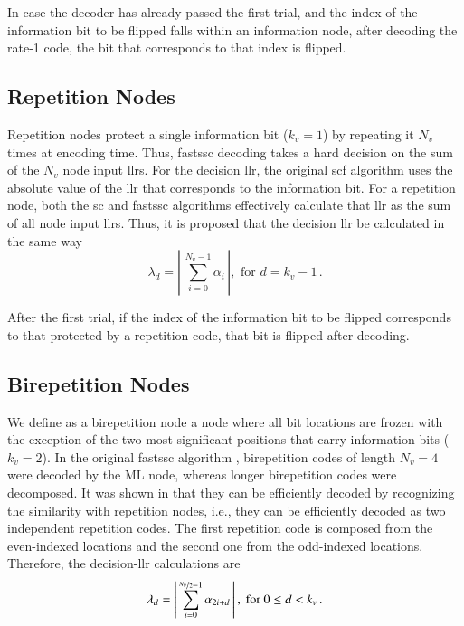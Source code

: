 \documentclass[conference]{IEEEtran}
\begin{document}
In case the decoder has already passed the first trial, and the index of the information bit to be flipped falls within an information node, after decoding the rate-1 code, the bit that corresponds to that index is flipped.

\subsection{Repetition Nodes}
Repetition nodes protect a single information bit ($k_v=1$) by repeating it $N_v$ times at encoding time. Thus, \gls{fastssc} decoding takes a hard decision on the sum of the $N_v$ node input \glspl{llr}. For the decision \gls{llr}, the original \gls{scf} algorithm uses the absolute value of the \gls{llr} that corresponds to the information bit. For a repetition node, both the \gls{sc} and \gls{fastssc} algorithms effectively calculate that \gls{llr} as the sum of all node input \glspl{llr}. Thus, it is proposed that the decision \gls{llr} be calculated in the same way
\begin{equation}
  \label{eq:rep:lambda}
  \lambda_d=\left|\,\sum_{i=0}^{N_v-1}\alpha_i\,\right|,\text{ for }d=k_v-1\,.
\end{equation}

After the first trial, if the index of the information bit to be flipped corresponds to that protected by a repetition code, that bit is flipped after decoding.

\subsection{Birepetition Nodes}
We define as a birepetition node a node where all bit locations are frozen with the exception of the two most-significant positions that carry information bits ($k_v=2$). In the original \gls{fastssc} algorithm \cite{Sarkis_JSAC_2014}, birepetition codes of length $N_v=4$ were decoded by the ML node, whereas longer birepetition codes were decomposed. It was shown in \cite{Hanif2017} that they can be efficiently decoded by recognizing the similarity with repetition nodes, i.e., they can be efficiently decoded as two independent repetition codes. The first repetition code is composed from the even-indexed locations and the second one from the odd-indexed locations. Therefore, the decision-\gls{llr} calculations are
\begin{equation}
  \label{eq:birep:lambda}
  \lambda_d=\left|\,\sum_{i=0}^{\nicefrac{N_v}{2}-1}\alpha_{2i+d}\,\right|, \text{ for } 0 \leq d < k_v\,.
\end{equation}
\end{document}
